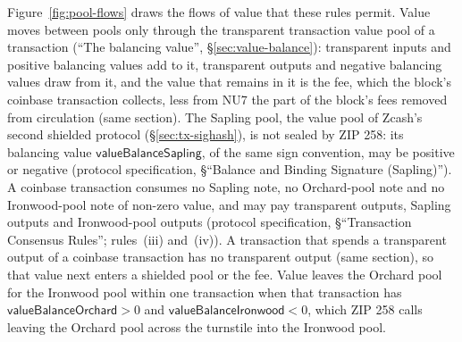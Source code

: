 \documentclass[11pt,a4paper]{article}
\theoremstyle{definition}
\begin{document}
Figure~\ref{fig:pool-flows} draws the flows of value that these rules
permit. Value moves between pools only through the transparent transaction
value pool of a transaction (``The balancing value'',
\S\ref{sec:value-balance}): transparent inputs and positive balancing values
add to it, transparent outputs and negative balancing values draw from it,
and the value that remains in it is the fee, which the block's coinbase
transaction collects, less from NU7 the part of the block's fees removed
from circulation (same section). The Sapling pool, the value pool of Zcash's
second shielded protocol (\S\ref{sec:tx-sighash}), is not sealed by ZIP 258:
its balancing value $\mathsf{valueBalanceSapling}$, of the same sign convention,
may be positive or negative (protocol specification, \S``Balance and Binding
Signature (Sapling)''). A coinbase transaction consumes no Sapling note, no
Orchard-pool note and no Ironwood-pool note of non-zero value, and may pay
transparent outputs, Sapling outputs and Ironwood-pool outputs (protocol
specification, \S``Transaction Consensus Rules''; rules~(iii) and~(iv)). A
transaction that spends a transparent output of a coinbase transaction has
no transparent output (same section), so that value next enters a shielded
pool or the fee. Value leaves the Orchard pool for the Ironwood pool within
one transaction when that transaction has $\mathsf{valueBalanceOrchard} > 0$
and $\mathsf{valueBalanceIronwood} < 0$, which ZIP 258 calls leaving the
Orchard pool across the turnstile into the Ironwood pool.
\end{document}
